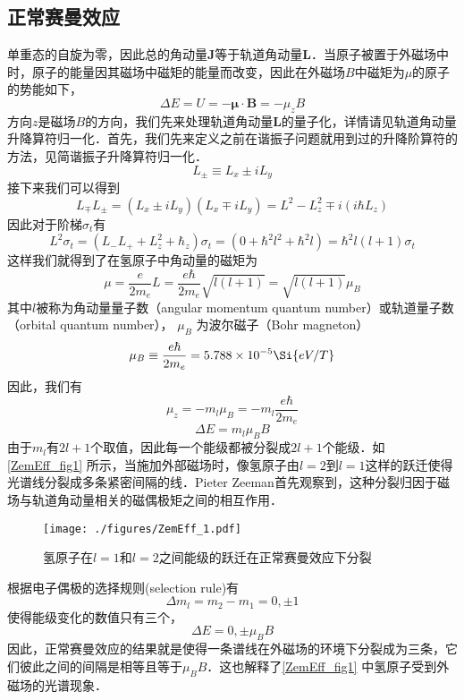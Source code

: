 \subsection{正常赛曼效应}
单重态的自旋为零，因此总的角动量$\mathbf{J}$等于轨道角动量$\mathbf{L}$．当原子被置于外磁场中时，原子的能量因其磁场中磁矩的能量而改变，因此在外磁场$B$中磁矩为$\mu$的原子的势能如下，
\begin{equation}
\Delta E=U = -\boldsymbol\mu\cdot \mathbf{B}=-\mu_z B
\end{equation}
方向$z$是磁场$B$的方向，我们先来处理轨道角动量$\mathbf{L}$的量子化，详情请见轨道角动量升降算符归一化．首先，我们先来定义之前在谐振子问题就用到过的升降阶算符的方法，见简谐振子升降算符归一化．
\begin{equation}
L_{\pm}\equiv L_x \pm iL_y
\end{equation}
接下来我们可以得到
\begin{equation}
L_{\mp}L_{\pm}=(L_x \pm i L_y)(L_x \mp i L_y)=L^2-L_z^2\mp i(i\hbar L_z)
\end{equation}
因此对于阶梯$\sigma_t$有
\begin{equation}
L^2\sigma_t=(L_{-}L_{+}+L^2_z+\hbar_z)\sigma_t=(0+\hbar^2l^2+\hbar^2l)=\hbar^2l(l+1)\sigma_t
\end{equation}
这样我们就得到了在氢原子中角动量的磁矩为
$$\mu=\frac{e}{2m_e}L=\frac{e\hbar}{2m_e}\sqrt{l(l+1)}=\sqrt{l(l+1)}\mu_B$$
其中$l$被称为角动量量子数（angular momentum quantum number）或轨道量子数（orbital quantum number）， $\mu_B$ 为波尔磁子（Bohr magneton）
\begin{equation}
\mu_B\equiv\frac{e\hbar}{2m_e}=5.788\times 10^{-5}\Si{eV/T}
\end{equation}
因此，我们有$$\mu_z=-m_l\mu_B=-m_l\frac{e\hbar}{2m_e}$$
\begin{equation}
\Delta E = m_l\mu_B B
\end{equation}
由于$m_l$有$2l+1$个取值，因此每一个能级都被分裂成$2l+1$个能级．如\autoref{ZemEff_fig1} 所示，当施加外部磁场时，像氢原子由$l=2$到$l=1$这样的跃迁使得光谱线分裂成多条紧密间隔的线．Pieter Zeeman首先观察到，这种分裂归因于磁场与轨道角动量相关的磁偶极矩之间的相互作用．
\begin{figure}[ht]
\centering
\texttt{[image: ./figures/ZemEff\_1.pdf]}
\caption{氢原子在$l=1$和$l=2$之间能级的跃迁在正常赛曼效应下分裂} \label{ZemEff_fig1}
\end{figure}
根据电子偶极的选择规则(selection rule)有
$$
\Delta m_l = m_2-m_1=0,\pm 1
$$
使得能级变化的数值只有三个，
$$
\Delta E = 0,\pm \mu_B B
$$
因此，正常赛曼效应的结果就是使得一条谱线在外磁场的环境下分裂成为三条，它们彼此之间的间隔是相等且等于$\mu_B B$．这也解释了\autoref{ZemEff_fig1} 中氢原子受到外磁场的光谱现象．
